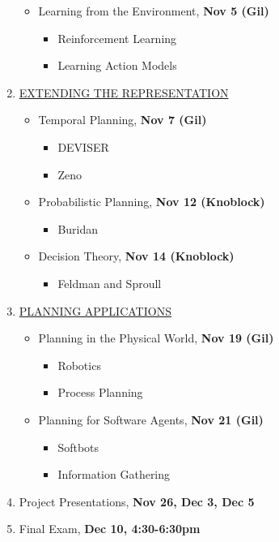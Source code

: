 \begin{enumerate}
\begin{itemize}
  \item Learning from the Environment, {\bf Nov 5 (Gil)}
    \begin{itemize}
    \item Reinforcement Learning \cite{sutton90} 
    \item Learning Action Models \cite{gil94}
    \end{itemize}
  \end{itemize}


\item \underline{EXTENDING THE REPRESENTATION}

  \begin{itemize}
  \item Temporal Planning, {\bf Nov 7 (Gil)}
     \begin{itemize}
     \item DEVISER \cite[pages 297--318]{allen90}
     \item Zeno \cite{penberthy94:aaai}
     \end{itemize}

  \item Probabilistic Planning, {\bf Nov 12 (Knoblock)}
     \begin{itemize}
     \item Buridan \cite{kushmerick94:aaai}
     \end{itemize}

  \item Decision Theory, {\bf Nov 14 (Knoblock)}
     \begin{itemize}
     \item Feldman and Sproull \cite[pages 207--224]{allen90}
     \end{itemize}
  \end{itemize}

\item \underline{PLANNING APPLICATIONS}

  \begin{itemize}
  \item Planning in the Physical World, {\bf Nov 19 (Gil)}
    \begin{itemize}
    \item Robotics \cite{simmons94}
    \item Process Planning \cite{nau95:ijcai}
    \end{itemize}

  \item Planning for Software Agents, {\bf Nov 21 (Gil)}
    \begin{itemize}
    \item Softbots \cite{etzioni94:softbots}
    \item Information Gathering \cite{knoblock95:ijcai}
    \end{itemize}
  \end{itemize}

\item Project Presentations, {\bf Nov 26, Dec 3, Dec 5}

\item Final Exam, {\bf Dec 10, 4:30-6:30pm}
\end{enumerate}

